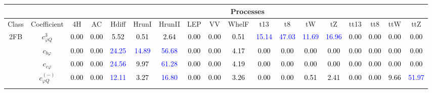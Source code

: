 \documentclass{article}
\begin{document}
\begin{landscape}
\begin{table}[H]
\scriptsize
\centering
\begin{tabular}{|c|c|c|c|c|c|c|c|c|c|c|c|c|c|c|c|c|c|}
\hline
\multicolumn{2}{|c|}{}                 & \multicolumn{16}{c|}{Processes} \\ \hline
 Class & Coefficient & {\rm 4H }& {\rm AC }& {\rm Hdiff }& {\rm HrunI }& {\rm HrunII }& {\rm LEP }& {\rm VV }& {\rm WhelF }& {\rm t13 }& {\rm t8 }& {\rm tW }& {\rm tZ }& {\rm tt13 }& {\rm tt8 }& {\rm ttW }& {\rm ttZ }\\ \hline
\multirow{10}{*}{2FB}
 & $c_{\varphi Q}^{3}$ & \textcolor{black}{0.00} & \textcolor{black}{0.00} & \textcolor{black}{5.52} & \textcolor{black}{0.51} & \textcolor{black}{2.64} & \textcolor{black}{0.00} & \textcolor{black}{0.00} & \textcolor{black}{0.51} & \textcolor{blue}{15.14} & \textcolor{blue}{47.03} & \textcolor{blue}{11.69} & \textcolor{blue}{16.96} & \textcolor{black}{0.00} & \textcolor{black}{0.00} & \textcolor{black}{0.00} & \textcolor{black}{0.00}\\ \cline{2-18}
 & $c_{b \varphi}$ & \textcolor{black}{0.00} & \textcolor{black}{0.00} & \textcolor{blue}{24.25} & \textcolor{blue}{14.89} & \textcolor{blue}{56.68} & \textcolor{black}{0.00} & \textcolor{black}{0.00} & \textcolor{black}{4.17} & \textcolor{black}{0.00} & \textcolor{black}{0.00} & \textcolor{black}{0.00} & \textcolor{black}{0.00} & \textcolor{black}{0.00} & \textcolor{black}{0.00} & \textcolor{black}{0.00} & \textcolor{black}{0.00}\\ \cline{2-18}
 & $c_{c \varphi}$ & \textcolor{black}{0.00} & \textcolor{black}{0.00} & \textcolor{blue}{24.56} & \textcolor{black}{9.97} & \textcolor{blue}{61.28} & \textcolor{black}{0.00} & \textcolor{black}{0.00} & \textcolor{black}{4.19} & \textcolor{black}{0.00} & \textcolor{black}{0.00} & \textcolor{black}{0.00} & \textcolor{black}{0.00} & \textcolor{black}{0.00} & \textcolor{black}{0.00} & \textcolor{black}{0.00} & \textcolor{black}{0.00}\\ \cline{2-18}
 & $c_{\varphi Q}^{(-)}$ & \textcolor{black}{0.00} & \textcolor{black}{0.00} & \textcolor{blue}{12.11} & \textcolor{black}{3.27} & \textcolor{blue}{16.80} & \textcolor{black}{0.00} & \textcolor{black}{0.00} & \textcolor{black}{3.26} & \textcolor{black}{0.00} & \textcolor{black}{0.00} & \textcolor{black}{0.51} & \textcolor{black}{2.41} & \textcolor{black}{0.00} & \textcolor{black}{0.00} & \textcolor{black}{9.66} & \textcolor{blue}{51.97}\\ \cline{2-18}

\end{tabular}
\end{table}
\end{landscape}
\end{document}
